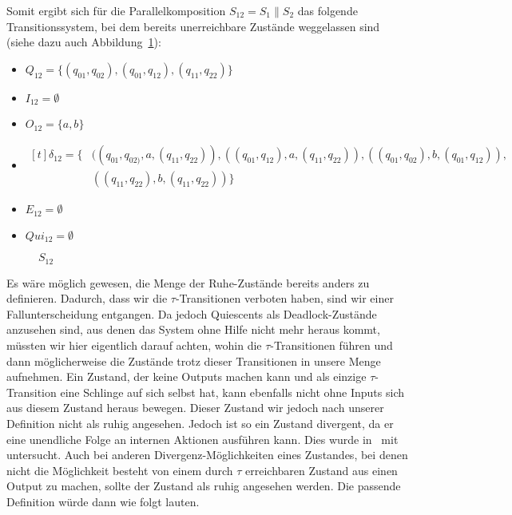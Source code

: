 Somit ergibt sich für die Parallelkomposition $S_{12} = S_1\| S_2$ das folgende
Transitionssystem, bei dem bereits unerreichbare Zustände weggelassen sind
(siehe dazu auch Abbildung~\ref{S12}):
\begin{itemize}
  \item $Q_{12}=\{(q_{01},q_{02}), (q_{01},q_{12}), (q_{11},q_{22})\}$
  \item $I_{12}=\emptyset$
  \item $O_{12}=\{a,b\}$
  \item $\begin{aligned}[t]
      \delta _{12} = \{&((q_{01},q_{02)},a,(q_{11},q_{22})),
      ((q_{01},q_{12}),a,(q_{11},q_{22})),
    ((q_{01},q_{02}),b,(q_{01},q_{12})),\\
  &((q_{11},q_{22}),b,(q_{11},q_{22}))\}
        \end{aligned}$
  \item $E_{12}=\emptyset$
  \item $Qui_{12}=\emptyset$
\end{itemize}
\begin{figure} [h!tbp]
\begin{center}
  \caption{$S_{12}$}
  \label{S12}
\end{center}
\end{figure}

Es wäre möglich gewesen, die Menge der Ruhe-Zustände bereits anders zu
definieren. Dadurch, dass wir die $\tau$-Transitionen verboten haben, sind wir
einer Fallunterscheidung entgangen. Da jedoch Quiescents als Deadlock-Zustände
anzusehen sind, aus denen das System ohne Hilfe nicht mehr heraus kommt,
müssten wir hier eigentlich darauf achten, wohin die $\tau$-Transitionen führen
und dann möglicherweise die Zustände trotz dieser Transitionen in unsere Menge
aufnehmen. Ein Zustand, der keine Outputs machen kann und als einzige
$\tau$-Transition eine Schlinge auf sich selbst hat, kann ebenfalls nicht ohne
Inputs sich aus diesem Zustand heraus bewegen. Dieser Zustand wir jedoch nach
unserer Definition nicht als ruhig angesehen. Jedoch ist so ein Zustand
divergent, da er eine unendliche Folge an internen Aktionen ausführen kann.
Dies wurde in~\cite{Chilton2013} mit untersucht. Auch bei anderen
Divergenz-Möglichkeiten eines Zustandes, bei denen nicht die Möglichkeit
besteht von einem durch $\tau$ erreichbaren Zustand aus einen Output zu machen,
sollte der Zustand als ruhig angesehen werden. Die passende Definition würde
dann wie folgt lauten.

